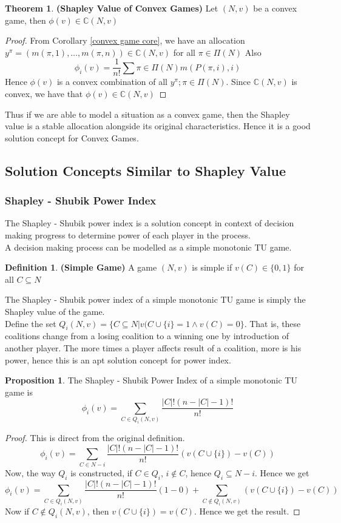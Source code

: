 \documentclass{article}
\theoremstyle{definition}
\newtheorem{theorem}{Theorem}[section]
\newtheorem{defn}{Definition}[section]
\newtheorem{prop}{Proposition}[section]
\begin{document}
\begin{theorem}
\textbf{(Shapley Value of Convex Games)} Let $(N,v)$ be a convex game, then $\phi(v) \in \mathbb{C}(N,v)$
\end{theorem}
\begin{proof}
From Corollary \ref{convex game core}, we have an allocation $y^\pi = (m(\pi,1),\dots,m(\pi,n)) \in \mathbb{C}(N,v)$ for all $ \pi \in \Pi(N)$ Also $$\phi_i(v) = \frac{1}{n!} \sum{\pi \in \Pi(N)} m(P(\pi,i),i)$$ Hence $\phi(v)$ is a convex combination of all $y^\pi; \pi\in \Pi(N)$. Since $\mathbb{C}(N,v)$ is convex, we have that $\phi(v) \in \mathbb{C}(N,v)$ 
\end{proof}
Thus if we are able to model a situation as a convex game, then the Shapley value is a stable allocation alongside its original characteristics. Hence it is a good solution concept for Convex Games.
\subsection{Solution Concepts Similar to Shapley Value}
\subsubsection{Shapley - Shubik Power Index}
The Shapley - Shubik power index is a solution concept in context of decision making progress to determine power of each player in the process.\\
A decision making process can be modelled as a simple monotonic TU game. 
\begin{defn}
\textbf{(Simple Game)} A game $(N,v)$ is simple if $v(C) \in \{0,1\}$ for all $C\subseteq N$
\end{defn}
The Shapley - Shubik power index of a simple monotonic TU game is simply the Shapley value of the game.\\
Define the set $Q_i(N,v) = \{C\subseteq N| v(C\cup\{i\} = 1 \land v(C) =0\}$. That is, these coalitions change from a losing coalition to a winning one by introduction of another player. The more times a player affects result of a coalition, more is his power, hence this is an apt solution concept for power index.
\begin{prop}
The Shapley - Shubik Power Index of a simple monotonic TU game is $$\phi_i(v) = \sum_{C \in Q_i(N,v)} \frac{|C|!(n-|C|-1)!}{n!}$$
\end{prop}
\begin{proof}
This is direct from the original definition.
$$\phi_i(v) = \sum_{C \in N-i} \frac{|C|!(n-|C|-1)!}{n!}(v(C\cup \{i\}) - v(C))$$
Now, the way $Q_i$ is constructed, if $C\in Q_i$, $i\notin C$, hence $Q_i \subseteq N-i$. Hence we get $$\phi_i(v) = \sum_{C \in Q_i(N,v)} \frac{|C|!(n-|C|-1)!}{n!}( 1 - 0) + \sum_{C\notin Q_i(N,v)}(v(C\cup\{i\}) - v(C))$$ Now if $C\notin Q_i(N,v)$, then $v(C\cup\{i\}) = v(C)$. Hence we get the result.
\end{proof}
\end{document}
